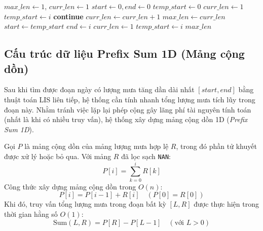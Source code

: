 \begin{algorithm}[H]
\caption{Thuật toán LIS liên tiếp phát hiện xu hướng lượng mưa}
\label{alg:lis}
\begin{algorithmic}[1]
    \State $max\_len \gets 1$, $curr\_len \gets 1$
    \State $start \gets 0, end \gets 0$
    \State $temp\_start \gets 0$
            \State $curr\_len \gets 1$
            \State $temp\_start \gets i$
            \State \textbf{continue}
        \EndIf
            \State $curr\_len \gets curr\_len + 1$
                \State $max\_len \gets curr\_len$
                \State $start \gets temp\_start$
                \State $end \gets i$
            \EndIf
        \Else
            \State $curr\_len \gets 1$
            \State $temp\_start \gets i$
        \EndIf
    \EndFor
    \State \Return $max\_len$
\EndProcedure
\end{algorithmic}
\end{algorithm}

\subsection{Cấu trúc dữ liệu Prefix Sum 1D (Mảng cộng dồn)}
Sau khi tìm được đoạn ngày có lượng mưa tăng dần dài nhất $[start, end]$ bằng thuật toán LIS liên tiếp, hệ thống cần tính nhanh tổng lượng mưa tích lũy trong đoạn này. Nhằm tránh việc lặp lại phép cộng gây lãng phí tài nguyên tính toán (nhất là khi có nhiều truy vấn), hệ thống xây dựng mảng cộng dồn 1D (\textit{Prefix Sum 1D}).

Gọi $P$ là mảng cộng dồn của mảng lượng mưa hợp lệ $R$, trong đó phần tử khuyết được xử lý hoặc bỏ qua. Với mảng $R$ đã lọc sạch \texttt{NAN}:
\begin{equation}
    P[i] = \sum_{k=0}^{i} R[k]
\end{equation}
Công thức xây dựng mảng cộng dồn trong $O(n)$:
\begin{equation}
    P[i] = P[i-1] + R[i] \quad (P[0] = R[0])
\end{equation}
Khi đó, truy vấn tổng lượng mưa trong đoạn bất kỳ $[L, R]$ được thực hiện trong thời gian hằng số $O(1)$:
\begin{equation}
    \text{Sum}(L, R) = P[R] - P[L-1] \quad (\text{với } L > 0)
\end{equation}

